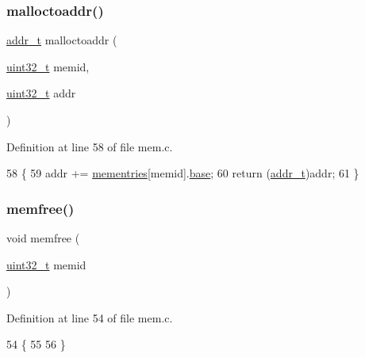 \subsubsection{\texorpdfstring{malloctoaddr()}{malloctoaddr()}}
{\footnotesize\ttfamily \hyperlink{a00095_a295f71165288684c38c6bb836fbb3c59_a295f71165288684c38c6bb836fbb3c59}{addr\+\_\+t} malloctoaddr (\begin{DoxyParamCaption}\item[{\hyperlink{a00095_a435d1572bf3f880d55459d9805097f62_a435d1572bf3f880d55459d9805097f62}{uint32\+\_\+t}}]{memid,  }\item[{\hyperlink{a00095_a435d1572bf3f880d55459d9805097f62_a435d1572bf3f880d55459d9805097f62}{uint32\+\_\+t}}]{addr }\end{DoxyParamCaption})}



Definition at line 58 of file mem.\+c.


\begin{DoxyCode}
58                                                    \{
59     addr += \hyperlink{a00107_a9ec3d7a60bca9bd965aba15905c6d1ed_a9ec3d7a60bca9bd965aba15905c6d1ed}{mementries}[memid].\hyperlink{a00164_ad6175fdf80547c655c7f35cff7ff82f9_ad6175fdf80547c655c7f35cff7ff82f9}{base};
60     \textcolor{keywordflow}{return} (\hyperlink{a00095_a295f71165288684c38c6bb836fbb3c59_a295f71165288684c38c6bb836fbb3c59}{addr\_t})addr;
61 \}
\end{DoxyCode}
\mbox{\label{a00107_a54eab910cb28c3f5ff9b02bf5feaa778_a54eab910cb28c3f5ff9b02bf5feaa778}} 
\subsubsection{\texorpdfstring{memfree()}{memfree()}}
{\footnotesize\ttfamily void memfree (\begin{DoxyParamCaption}\item[{\hyperlink{a00095_a435d1572bf3f880d55459d9805097f62_a435d1572bf3f880d55459d9805097f62}{uint32\+\_\+t}}]{memid }\end{DoxyParamCaption})}



Definition at line 54 of file mem.\+c.


\begin{DoxyCode}
54                              \{
55     
56 \}
\end{DoxyCode}
\mbox{\label{a00107_a60f8bf957bca47c651dc4024dc26f36e_a60f8bf957bca47c651dc4024dc26f36e}} 
